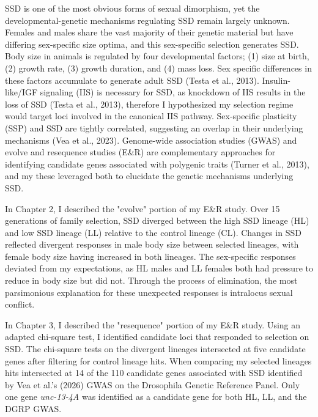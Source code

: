 \documentclass[12pt,reqno,oneside]{report}
\begin{document}
SSD is one of the most obvious forms of sexual dimorphism, yet the developmental-genetic mechanisms regulating SSD remain largely unknown. Females and males share the vast majority of their genetic material but have differing sex-specific size optima, and this sex-specific selection generates SSD. Body size in animals is regulated by four developmental factors; (1) size at birth, (2) growth rate, (3) growth duration, and (4) mass loss. Sex specific differences in these factors accumulate to generate adult SSD (Testa et al., 2013). Insulin-like/IGF signaling (IIS) is necessary for SSD, as knockdown of IIS results in the loss of SSD (Testa et al., 2013), therefore I hypothesized my selection regime would target loci involved in the canonical IIS pathway. Sex-specific plasticity (SSP) and SSD are tightly correlated, suggesting an overlap in their underlying mechanisms (Vea et al., 2023). Genome-wide association studies (GWAS) and evolve and resequence studies (E\&R) are complementary approaches for identifying candidate genes associated with polygenic traits (Turner et al., 2013), and my these leveraged both to elucidate the genetic mechanisms underlying SSD.

In Chapter 2, I described the "evolve" portion of my E\&R study. Over 15 generations of family selection, SSD diverged between the high SSD lineage (HL) and low SSD lineage (LL) relative to the control lineage (CL). Changes in SSD reflected divergent responses in male body size between selected lineages, with female body size having increased in both lineages. The sex-specific responses deviated from my expectations, as HL males and LL females both had pressure to reduce in body size but did not. Through the process of elimination, the most parsimonious explanation for these unexpected responses is intralocus sexual conflict.

In Chapter 3, I described the "resequence" portion of my E\&R study. Using an adapted chi-square test, I identified candidate loci that responded to selection on SSD. The chi-square tests on the divergent lineages intersected at five candidate genes after filtering for control lineage hits. When comparing my selected lineages hits intersected at 14 of the 110 candidate genes associated with SSD identified by Vea et al.'s (2026) GWAS on the Drosophila Genetic Reference Panel. Only one gene \textit{unc-13-4A} was identified as a candidate gene for both HL, LL, and the DGRP GWAS.
\end{document}
